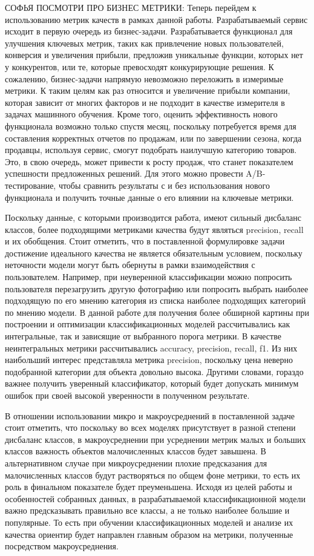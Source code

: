 \documentclass[a4paper,12pt]{extarticle}
\begin{document}
СОФЬЯ ПОСМОТРИ ПРО БИЗНЕС МЕТРИКИ:
Теперь перейдем к использованию метрик качеств в рамках данной работы. Разрабатываемый сервис исходит в первую очередь из бизнес-задачи. Разрабатывается функционал для улучшения ключевых метрик, таких как привлечение новых пользователей, конверсия и увеличения прибыли, предложив уникальные функции, которых нет у конкурентов, или те, которые превосходят конкурирующие решения. К сожалению, бизнес-задачи напрямую невозможно переложить в измеримые метрики. К таким целям как раз относится и увеличение прибыли компании, которая зависит от многих факторов и не подходит в качестве измерителя в задачах машинного обучения. Кроме того, оценить эффективность нового функционала возможно только спустя месяц, поскольку потребуется время для составления корректных отчетов по продажам, или по завершении сезона, когда продавцы, используя сервис, смогут подобрать наилучшую категорию товаров. Это, в свою очередь, может привести к росту продаж, что станет показателем успешности предложенных решений. Для этого можно провести A/B-тестирование, чтобы сравнить результаты с и без использования нового функционала и получить точные данные о его влиянии на ключевые метрики.

Поскольку данные, с которыми производится работа, имеют сильный дисбаланс классов, более подходящими метриками качества будут являться precision, recall и их обобщения. Стоит отметить, что в поставленной формулировке задачи достижение идеального качества не является обязательным условием, поскольку неточности модели могут быть обернуты в рамки взаимодействия с пользователем. Например, при неуверенной классификации можно попросить пользователя перезагрузить другую фотографию или попросить выбрать наиболее подходящую по его мнению категория из списка наиболее подходящих категорий по мнению модели. В данной работе для получения более обширной картины при построении и оптимизации классификационных моделей рассчитывались как интегральные, так и зависящие от выбранного порога метрики. В качестве неинтегральных метрики рассчитывались accuracy, precision, recall, f1. Из них наибольший интерес представляла метрика precision, поскольку цена неверно подобранной категории для объекта довольно высока. Другими словами, гораздо важнее получить уверенный классификатор, который будет допускать минимум ошибок при своей высокой уверенности в полученном результате.

В отношении использовании микро и макроусреднений в поставленной задаче стоит отметить, что поскольку во всех моделях присутствует в разной степени дисбаланс классов, в макроусреднении при усреднении метрик малых и больших классов важность объектов малочисленных классов будет завышена. В альтернативном случае при микроусреднении плохие предсказания для малочисленных классов будут растворяться по общем фоне метрики, то есть их роль в финальном показателе будет преуменьшена. Исходя из целей работы и особенностей собранных данных, в разрабатываемой классификационной модели важно предсказывать правильно все классы, а не только наиболее большие и популярные. То есть при обучении классификационных моделей и анализе их качества ориентир будет направлен главным образом на метрики, полученные посредством макроусреднения.
\end{document}
